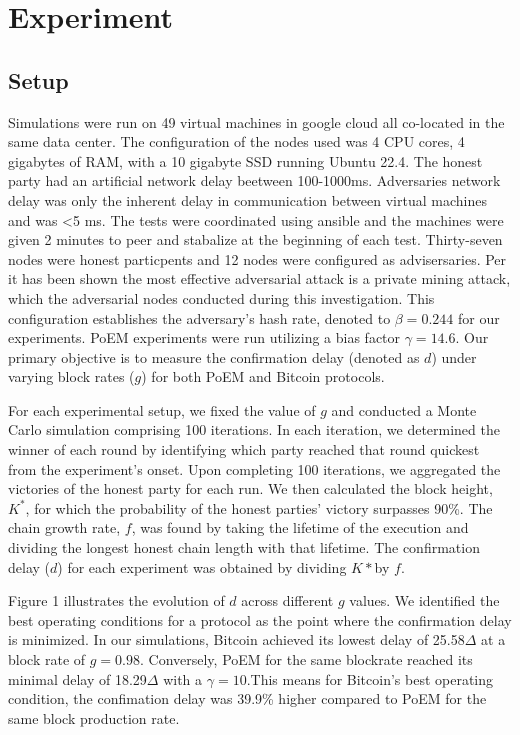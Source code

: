 \section{Experiment}

\subsection{Setup}

Simulations were run on 49 virtual machines in google cloud all co-located in
the same data center. The configuration of the nodes used was 4 CPU cores, 4
gigabytes of RAM, with a 10 gigabyte SSD running Ubuntu 22.4. The honest party
had an artificial network delay beetween 100-1000ms. Adversaries network delay
was only the inherent delay in communication between virtual machines and was
<5 ms. The tests were coordinated using ansible and the machines were given 2
minutes to peer and stabalize at the beginning of each test. Thirty-seven nodes
were honest particpents and 12 nodes were configured as advisersaries.
Per\cite{eiar} it has been shown the most effective adversarial attack is a
private mining attack, which the adversarial nodes conducted during this
investigation. This configuration establishes the adversary's hash rate,
denoted to $\beta=0.244$ for our experiments. PoEM
experiments were run utilizing a bias factor $\gamma=14.6$. Our primary objective is
to measure the confirmation delay (denoted as $d$) under varying block rates
($g$) for both PoEM and Bitcoin protocols.

For each experimental setup, we fixed the value of $g$ and conducted a Monte
Carlo simulation comprising 100 iterations. In each iteration, we determined
the winner of each round by identifying which party reached that round quickest
from the experiment's onset. Upon completing 100 iterations, we aggregated the
victories of the honest party for each run. We then calculated the block
height, $K^*$, for which the probability of the honest parties' victory
surpasses 90\%. The chain growth rate, $f$, was found by taking the lifetime of
the execution and dividing the longest honest chain length with that lifetime.
The confirmation delay ($d$) for each experiment was obtained by dividing
$K*$by $f$.

Figure 1 illustrates the evolution of $d$ across different $g$ values. We
identified the best operating conditions for a protocol as the point where the
confirmation delay is minimized. In our simulations, Bitcoin achieved its
lowest delay of 25.58$\Delta$ at a block rate of $g=0.98$. Conversely, PoEM for the same blockrate reached its
minimal delay of 18.29$\Delta$ with a $\gamma=10$.This means for Bitcoin's best operating condition, the confimation delay was 
39.9\% higher compared to PoEM for the same block production rate. 


